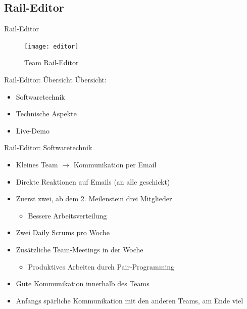 \subsection{Rail-Editor}

\begin{frame}{Rail-Editor}

\begin{figure}
  \begin{center}
    \leavevmode
      \texttt{[image: editor]}
    \caption{Team Rail-Editor}
  \end{center}
\end{figure}

\end{frame}

\begin{frame}{Rail-Editor: Übersicht}
	\pause
	Übersicht:
	\begin{itemize}
		\pause
		\item Softwaretechnik
		\pause
		\item Technische Aspekte
		\pause
		\item Live-Demo
	\end{itemize}
\end{frame}

\pagebreak

\begin{frame}{Rail-Editor: Softwaretechnik}
	\pause
	\begin{itemize}
	\item Kleines Team $\rightarrow$ Kommunikation per Email
	\pause
	\item Direkte Reaktionen auf Emails (an alle geschickt)
	\pause
	\item Zuerst zwei, ab dem 2. Meilenstein drei Mitglieder
	\begin{itemize}
	\item Bessere Arbeitsverteilung
	\end{itemize}
	\pause
	\item Zwei Daily Scrums pro Woche
	\pause
	\item Zusätzliche Team-Meetings in der Woche
	\begin{itemize}
	\item Produktives Arbeiten durch Pair-Programming
	\end{itemize}
	\pause
	\item Gute Kommunikation innerhalb des Teams
	\pause
	\item Anfangs spärliche Kommunikation mit den anderen Teams, am Ende viel
	\end{itemize}
\end{frame}

